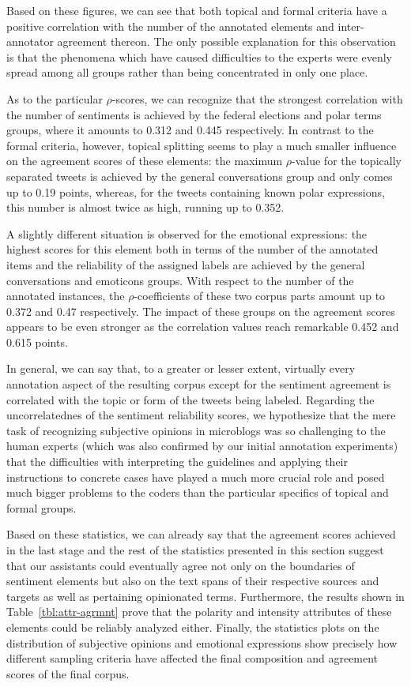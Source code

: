Based on these figures, we can see that both topical and formal
criteria have a positive correlation with the number of the annotated
elements and inter-annotator agreement thereon.  The only possible
explanation for this observation is that the phenomena which have
caused difficulties to the experts were evenly spread among all groups
rather than being concentrated in only one place.

As to the particular $\rho$-scores, we can recognize that the
strongest correlation with the number of sentiments is achieved by the
federal elections and polar terms groups, where it amounts to 0.312
and 0.445 respectively.  In contrast to the formal criteria, however,
topical splitting seems to play a much smaller influence on the
agreement scores of these elements: the maximum $\rho$-value for the
topically separated tweets is achieved by the general conversations
group and only comes up to 0.19 points, whereas, for the tweets
containing known polar expressions, this number is almost twice as
high, running up to 0.352.

A slightly different situation is observed for the emotional
expressions: the highest scores for this element both in terms of the
number of the annotated items and the reliability of the assigned
labels are achieved by the general conversations and emoticons groups.
With respect to the number of the annotated instances, the
$\rho$-coefficients of these two corpus parts amount up to 0.372 and
0.47 respectively.  The impact of these groups on the agreement scores
appears to be even stronger as the correlation values reach remarkable
0.452 and 0.615 points.

In general, we can say that, to a greater or lesser extent, virtually
every annotation aspect of the resulting corpus except for the
sentiment agreement is correlated with the topic or form of the tweets
being labeled.  Regarding the uncorrelatednes of the sentiment
reliability scores, we hypothesize that the mere task of recognizing
subjective opinions in microblogs was so challenging to the human
experts (which was also confirmed by our initial annotation
experiments) that the difficulties with interpreting the guidelines
and applying their instructions to concrete cases have played a much
more crucial role and posed much bigger problems to the coders than
the particular specifics of topical and formal groups.

Based on these statistics, we can already say that the agreement
scores achieved in the last stage and the rest of the statistics
presented in this section suggest that our assistants could eventually
agree not only on the boundaries of sentiment elements but also on the
text spans of their respective sources and targets as well as
pertaining opinionated terms.  Furthermore, the results shown in
Table~\ref{tbl:attr-agrmnt} prove that the polarity and intensity
attributes of these elements could be reliably analyzed either.
Finally, the statistics plots on the distribution of subjective
opinions and emotional expressions show precisely how different
sampling criteria have affected the final composition and agreement
scores of the final corpus.

